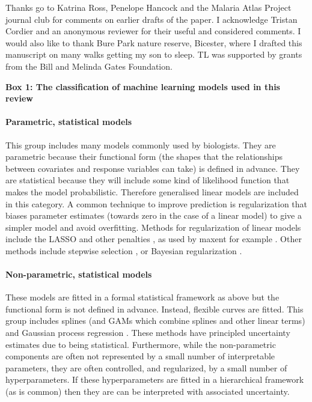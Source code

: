 \documentclass[12pt]{article}
\let\oldparagraph\paragraph
\renewcommand{\paragraph}[1]{\oldparagraph{#1}\mbox{}}
\begin{document}
Thanks go to Katrina Ross, Penelope Hancock and the Malaria Atlas Project journal club for comments on earlier drafts of the paper.
I acknowledge Tristan Cordier and an anonymous reviewer for their useful and considered comments.
I would also like to thank Bure Park nature reserve, Bicester, where I drafted this manuscript on many walks getting my son to sleep.
TL was supported by grants from the Bill and Melinda Gates Foundation.








\begin{figure*}[h!]
\centering
\colorbox{boxcolour}{
\begin{minipage}{1.1\textwidth}


\setlength{\parindent}{3mm}
\noindent\textsf{\textbf{Box 1: The classification of machine learning models used in this review}} 
\doublespacing
\vspace{-5mm}
\paragraph{Parametric, statistical models}
This group includes many models commonly used by biologists.
They are parametric because their functional form (the shapes that the relationships between covariates and response variables can take) is defined in advance.
They are statistical because they will include some kind of likelihood function that makes the model probabilistic.
Therefore generalised linear models are included in this category.
A common technique to improve prediction is regularization that biases parameter estimates (towards zero in the case of a linear model) to give a simpler model and avoid overfitting.
Methods for regularization of linear models include the LASSO and other penalties \citep{tibshirani1996regression, zou2005regularization}, as used by maxent for example  \citep{maxent}. 
Other methods include stepwise selection \citep{hocking1976biometrics}, or Bayesian regularization \citep{park2008bayesian, liu2018bayesian}.

\paragraph{Non-parametric, statistical models}
These models are fitted in a formal statistical framework as above but the functional form is not defined in advance.
Instead, flexible curves are fitted.
This group includes splines (and GAMs which combine splines and other linear terms) and Gaussian process regression \citep{rasmussen2004gaussian}.
These methods have principled uncertainty estimates due to being statistical.
Furthermore, while the non-parametric components are often not represented by a small number of interpretable parameters, they are often controlled, and regularized, by a small number of hyperparameters.
If these hyperparameters are fitted in a hierarchical framework (as is common) then they are can be interpreted with associated uncertainty.


\end{minipage}}
\end{figure*}
\end{document}

